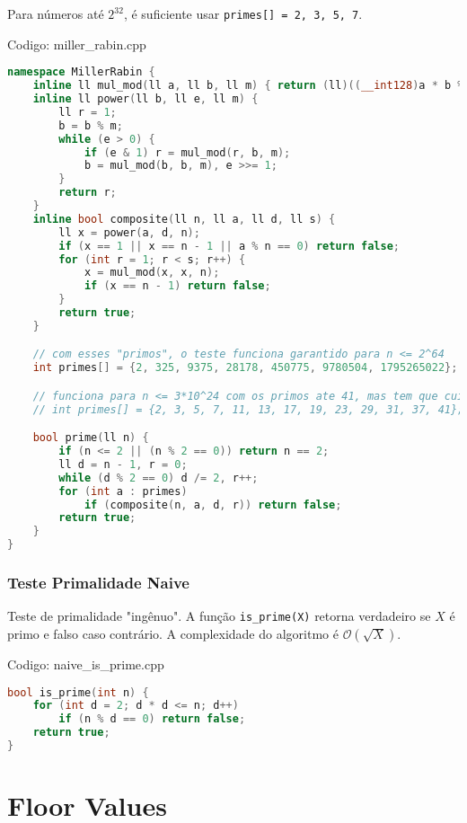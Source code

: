 \documentclass[10pt, a4paper, oneside]{book}
\begin{document}
Para números até $2^{32}$, é suficiente usar \texttt{primes[] = {2, 3, 5, 7}}.
\hfill

Codigo: miller\_rabin.cpp

\begin{lstlisting}[language=C++]
namespace MillerRabin {
    inline ll mul_mod(ll a, ll b, ll m) { return (ll)((__int128)a * b % m); }
    inline ll power(ll b, ll e, ll m) {
        ll r = 1;
        b = b % m;
        while (e > 0) {
            if (e & 1) r = mul_mod(r, b, m);
            b = mul_mod(b, b, m), e >>= 1;
        }
        return r;
    }
    inline bool composite(ll n, ll a, ll d, ll s) {
        ll x = power(a, d, n);
        if (x == 1 || x == n - 1 || a % n == 0) return false;
        for (int r = 1; r < s; r++) {
            x = mul_mod(x, x, n);
            if (x == n - 1) return false;
        }
        return true;
    }

    // com esses "primos", o teste funciona garantido para n <= 2^64
    int primes[] = {2, 325, 9375, 28178, 450775, 9780504, 1795265022};

    // funciona para n <= 3*10^24 com os primos ate 41, mas tem que cuidar com overflow
    // int primes[] = {2, 3, 5, 7, 11, 13, 17, 19, 23, 29, 31, 37, 41};

    bool prime(ll n) {
        if (n <= 2 || (n % 2 == 0)) return n == 2;
        ll d = n - 1, r = 0;
        while (d % 2 == 0) d /= 2, r++;
        for (int a : primes)
            if (composite(n, a, d, r)) return false;
        return true;
    }
}\end{lstlisting}
\hfill

\subsubsection{Teste Primalidade Naive}


Teste de primalidade "ingênuo". A função \texttt{is\_prime(X)} retorna verdadeiro se $X$ é primo e falso caso contrário. A complexidade do algoritmo é $\mathcal{O}(\sqrt{X})$.
\hfill

Codigo: naive\_is\_prime.cpp

\begin{lstlisting}[language=C++]
bool is_prime(int n) {
    for (int d = 2; d * d <= n; d++)
        if (n % d == 0) return false;
    return true;
}
\end{lstlisting}
\hfill

\section{Floor Values}
\end{document}
